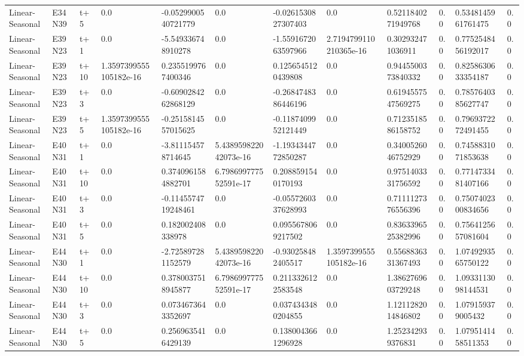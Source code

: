 \begin{landscape}
\begin{longtable}{llllllllllll}
Linear-Seasonal & E34N39 & t+5 & 0.0 & -0.0529900540721779 & 0.0 & -0.0261530827307403 & 0.0 & 0.5211840271949768 & 0.0 & 0.5348145961761475 & 0.0 \\
Linear-Seasonal & E39N23 & t+1 & 0.0 & -5.549336748910278 & 0.0 & -1.5591672063597966 & 2.7194799110210365e-16 & 0.302932471036911 & 0.0 & 0.7752548456192017 & 0.0 \\
Linear-Seasonal & E39N23 & t+10 & 1.3597399555105182e-16 & 0.2355199767400346 & 0.0 & 0.1256545120439808 & 0.0 & 0.9445500373840332 & 0.0 & 0.8258630633354187 & 0.0 \\
Linear-Seasonal & E39N23 & t+3 & 0.0 & -0.6090284262868129 & 0.0 & -0.2684748386446196 & 0.0 & 0.6194557547569275 & 0.0 & 0.7857640385627747 & 0.0 \\
Linear-Seasonal & E39N23 & t+5 & 1.3597399555105182e-16 & -0.2515814557015625 & 0.0 & -0.1187409952121449 & 0.0 & 0.7123518586158752 & 0.0 & 0.7969372272491455 & 0.0 \\
Linear-Seasonal & E40N31 & t+1 & 0.0 & -3.811154578714645 & 5.438959822042073e-16 & -1.1934344772850287 & 0.0 & 0.3400526046752929 & 0.0 & 0.7458831071853638 & 0.0 \\
Linear-Seasonal & E40N31 & t+10 & 0.0 & 0.3740961584882701 & 6.798699777552591e-17 & 0.2088591540170193 & 0.0 & 0.9751403331756592 & 0.0 & 0.7714733481407166 & 0.0 \\
Linear-Seasonal & E40N31 & t+3 & 0.0 & -0.1145574719248461 & 0.0 & -0.0557260337628993 & 0.0 & 0.7111127376556396 & 0.0 & 0.7507402300834656 & 0.0 \\
Linear-Seasonal & E40N31 & t+5 & 0.0 & 0.182002408338978 & 0.0 & 0.0955678069217502 & 0.0 & 0.8363396525382996 & 0.0 & 0.7564125657081604 & 0.0 \\
Linear-Seasonal & E44N30 & t+1 & 0.0 & -2.725897281152579 & 5.438959822042073e-16 & -0.930258482405517 & 1.3597399555105182e-16 & 0.5568836331367493 & 0.0 & 1.0749293565750122 & 0.0 \\
Linear-Seasonal & E44N30 & t+10 & 0.0 & 0.3780037518945877 & 6.798699777552591e-17 & 0.2113326122583548 & 0.0 & 1.3862769603729248 & 0.0 & 1.0933113098144531 & 0.0 \\
Linear-Seasonal & E44N30 & t+3 & 0.0 & 0.0734673643352697 & 0.0 & 0.0374343480204855 & 0.0 & 1.1211282014846802 & 0.0 & 1.079159379005432 & 0.0 \\
Linear-Seasonal & E44N30 & t+5 & 0.0 & 0.2569635416429139 & 0.0 & 0.1380043661296928 & 0.0 & 1.252342939376831 & 0.0 & 1.0795141458511353 & 0.0 \\

\end{longtable}
\end{landscape}
